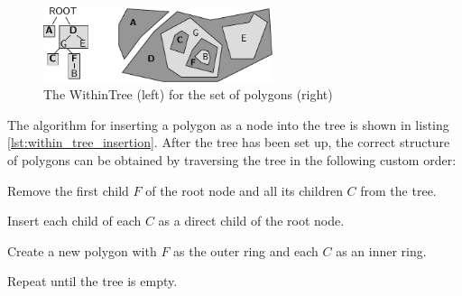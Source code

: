 \begin{figure}[ht]
  \vspace{1em}
  \centering
  \includegraphics[width=0.6\textwidth]{graphics/development/implementation/within_tree}
  \caption{The WithinTree (left) for the set of polygons (right)}
  \label{fig:within_tree}
\end{figure}

The algorithm for inserting a polygon as a node into the tree is shown in listing \ref{lst:within_tree_insertion}. After the tree has been set up, the correct structure of polygons can be obtained by traversing the tree in the following custom order:

\begin{compactenum}
  \item Remove the first child $F$ of the root node and all its children $C$ from the tree.
  \item Insert each child of each $C$ as a direct child of the root node.
  \item Create a new polygon with $F$ as the outer ring and each $C$ as an inner ring.
  \item Repeat until the tree is empty.
\end{compactenum}



